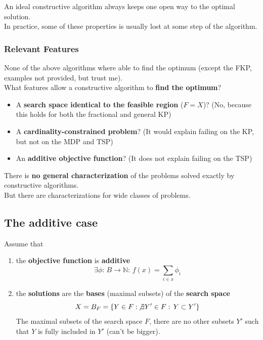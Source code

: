 \documentclass[11pt]{article}
\begin{document}
	An ideal constructive algorithm always keeps one open way to the optimal solution.\\
	
	In practice, some of these properties is usually lost at some step of the algorithm.\\
	
	
	\subsubsection{Relevant Features}
	None of the above algorithms where able to find the optimum (except the FKP, examples not provided, but trust me).\\
	
	What features allow a constructive algorithm to \textbf{find the optimum}? 
	\begin{itemize}
		\item A \textbf{search space identical to the feasible region} ($F = X$)? (No, because this holds for both the fractional and general KP)
		\item A \textbf{cardinality-constrained problem}? (It would explain failing on the KP, but not on the MDP and TSP)
		\item An \textbf{additive objective function}? (It does not explain failing on the TSP)
	\end{itemize}
	
	There is \textbf{no general characterization} of the problems solved exactly by constructive algorithms.\\
	
	But there are characterizations for wide classes of problems.\\
	
	\newpage
	
	\subsection{The additive case}
	Assume that
	\begin{enumerate}
		\item the \textbf{objective function} is \textbf{additive}
		$$ \exists \phi: \, B \rightarrow \mathbb{N}: \, f(x) = \sum_{i \in x} \phi_i $$
		
		\item the \textbf{solutions} are the \textbf{bases} (maximal subsets) of the \textbf{search space}
		$$ X = B_F = \left\{Y \in F: \, \not \exists Y' \in F: \, Y \subset Y' \right\} $$
		The maximal subsets of the search space $F$, there are no other subsets $Y'$ such that $Y$ is fully included in $Y'$ (can't be bigger).
	\end{enumerate}
	
\end{document}
